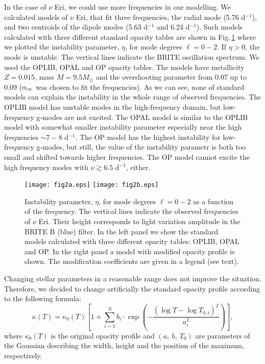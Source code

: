 \documentclass{ptapap}
\begin{document}
In the case of  $\nu$ Eri, we could use more frequencies in our modelling. We calculated models of $\nu$ Eri, that fit three frequencies, the radial mode (5.76 d$^{-1}$), and two centroids of the dipole modes (5.63 d$^{-1}$ and 6.24 d$^{-1}$). Such models calculated with three different standard opacity tables are shown in Fig.\,\ref{fig:nuEri} where we plotted the instability parameter, $\eta$, for mode degrees $\ell=0-2$. If $\eta>0$, the mode is unstable. The vertical lines indicate the BRITE oscillation spectrum. We used the OPLIB, OPAL \citep{OPAL} and OP \citep{OP} opacity tables. The models have metallicity $Z=0.015$, mass $M=9.5M_{\odot}$ and the overshooting parameter from 0.07 up to 0.09 ($\alpha_{\rm{ov}}$ was chosen to fit the frequencies). As we can see, none of standard models can explain the instability in the whole range of observed frequencies. The OPLIB model has unstable modes in the high-frequency domain, but low-frequency g-modes are not excited. The OPAL model is similar to the OPLIB model with somewhat smaller instability parameter especially near the high frequencies $\sim 7-8$ d$^{-1}$. The OP model has the highest instability for low-frequency g-modes, but still, the value of the instability parametr is both too small and shifted towards higher frequencies. The OP model cannot excite the high frequency modes with $\nu\gtrsim6.5$ d$^{-1}$, either.


\begin{figure}[h]
\texttt{[image: fig2a.eps]}
\texttt{[image: fig2b.eps]}
\caption{Instability parameter, $\eta$, for mode degrees $\ell=0-2$ as a function of the frequency. The vertical lines indicate the observed frequencies of $\nu$ Eri. Their height corresponds to light variation amplitude in the BRITE B (blue) filter. In the left panel we show the standard models calculated with three different opacity tables: OPLIB, OPAL and OP. In the right panel a model with modified opacity profile  is shown. The modification coefficients are given in a legend (see text).}
\label{fig:nuEri}
\end{figure}


Changing stellar parameters in a reasonable range does not improve the situation. Therefore, we decided to change artificially the standard opacity profile according to the following formula:
\begin{equation}
  \kappa (T)=\kappa_0(T) \left[1+\sum_{i=1}^N b_i \cdot\exp\left( -\frac{(\log T-\log T_{0,i})^2}{a_i^2}\right) \right],
\end{equation}
where $\kappa_0(T)$ is the original opacity profile and $(a,~b,~T_0)$ are parameters of the Gaussian describing the width, height and the position of the maximum, respectively.
\end{document}
